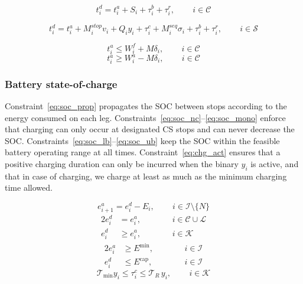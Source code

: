 \documentclass[preprint,12pt,3p]{elsarticle}
\begin{document}
\begin{equation}
    t_i^d = t_i^a + S_i + \tau_i^{b} + \tau_i^r,
    \qquad \, i \in \mathcal{C}
    \label{eq:depart_C}
\end{equation}

\begin{equation}
    t_i^d = t_i^a +  M_i^{stop} v_i + Q_i y_i + \tau_i^c + M_i^{seq} \sigma_i + \tau_i^{b} + \tau_i^r,
    \qquad \, i \in \mathcal{S}
    \label{eq:depart_K}
\end{equation}


\begin{equation}
    t_i^a \leq W_i^{f} + M \delta_i,
    \qquad \, i \in \mathcal{C}
    \label{eq:tw_soft1}
\end{equation}
\begin{equation}
    t_i^a \geq W_i^{a} - M \delta_i,
    \qquad \, i \in \mathcal{C}
    \label{eq:tw_soft2}
\end{equation}


\subsubsection{Battery state-of-charge}
Constraint~\eqref{eq:soc_prop} propagates the SOC between stops according to the energy consumed on each leg. Constraints~\eqref{eq:soc_nc}--\eqref{eq:soc_mono} enforce that charging can only occur at designated CS stops and can never decrease the SOC. Constraints~\eqref{eq:soc_lb}--\eqref{eq:soc_ub} keep the SOC within the feasible battery operating range at all times. Constraint~\eqref{eq:chg_act} ensures that a positive charging duration can only be incurred when the binary $y_i$ is active, and that in case of charging, we charge at least as much as the minimum charging time allowed.

\begin{equation}
    e_{i+1}^a = e_i^d - E_i,
    \qquad \, i \in \mathcal{I}\setminus\{N\}
    \label{eq:soc_prop}
\end{equation}
\begin{alignat}{2}
    e_i^d &= e_i^a, &\qquad& \, i \in \mathcal{C} \cup \mathcal L \label{eq:soc_nc}\\
    e_i^d &\geq e_i^a, &\qquad& \, i \in \mathcal{K} \label{eq:soc_mono}
\end{alignat}
\begin{alignat}{2}
    e_i^a &\geq E^{\min}, &\qquad& \, i \in \mathcal{I}
    \label{eq:soc_lb}\\
    e_i^d &\leq E^{\mathrm{cap}}, &\qquad& \, i \in \mathcal{I}
    \label{eq:soc_ub}
\end{alignat}
\begin{equation}
    \mathcal{T}_{\text{min}} y_i \leq \tau_i^c \leq \mathcal{T}_R\, y_i,
    \qquad \, i \in \mathcal{K}
    \label{eq:chg_act}
\end{equation}
\end{document}
